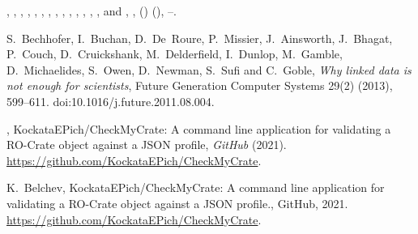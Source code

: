 \documentclass[ds,v1.1.2,openaccess]{iosart2x}%
\begin{document}
\begin{thebibliography}{}
%
\begin{barticle}
,
,
,
,
,
,
,
,
,
,
,
,
,
,
 and
,
,
()
(),
--.
\end{barticle}
%
\OrigBibText
S.~Bechhofer,
I.~Buchan,
D.~De~Roure,
P.~Missier,
J.~Ainsworth,
J.~Bhagat,
P.~Couch,
D.~Cruickshank,
M.~Delderfield,
I.~Dunlop,
M.~Gamble,
D.~Michaelides,
S.~Owen,
D.~Newman,
S.~Sufi and
C.~Goble,
\textit{Why linked data is not enough for scientists},
Future Generation Computer Systems
29(2)
(2013),
599--611.
doi:10.1016/j.future.2011.08.004.
\endOrigBibText
{}
\endbibitem

%
\begin{botherref}
,
{KockataEPich}/{CheckMyCrate}: A command line application for
validating a {RO}-Crate object against a {JSON} profile,
\textit{GitHub}
(2021).
\url{https://github.com/KockataEPich/CheckMyCrate}.
\end{botherref}
%
\OrigBibText
K.~Belchev,
{KockataEPich}/{CheckMyCrate}: A command line application for
validating a
{RO}-Crate object against a {JSON} profile.,
GitHub,
2021.
\url{https://github.com/KockataEPich/CheckMyCrate}.
\endOrigBibText
{}
\endbibitem


\end{thebibliography}
\end{document}
